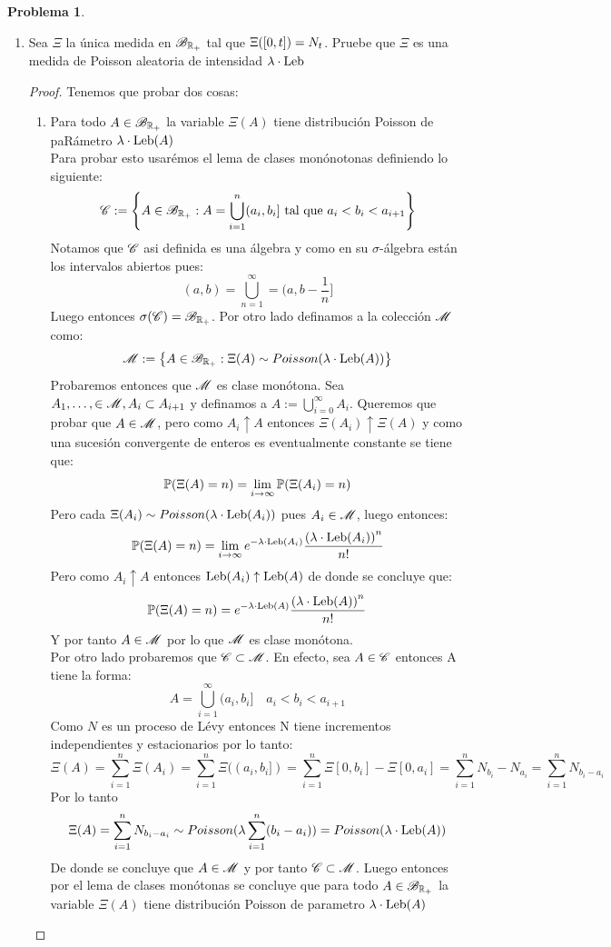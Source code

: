 \documentclass[a5paper,oneside]{amsart}
\theoremstyle{plain}
\theoremstyle{definition}
\newtheorem{problema}{Problema}
\begin{document}
\begin{problema}
\begin{enumerate}
\item Sea $\Xi$ la \'unica medida en $\mathscr{B}_{\mathbb{R}_+}$ tal que $\Xi\!\left( [0,t]\right) =N_t$. Pruebe que $\Xi$ es una medida de Poisson aleatoria de intensidad $\lambda \cdot\text{Leb}$
\begin{proof}
Tenemos que probar dos cosas:
\begin{enumerate}
\item Para todo $A\in \mathscr{B}_{\mathbb{R}_+}$ la variable $\Xi(A)$ tiene distribuci\'on  Poisson  de paR\'ametro $\lambda \cdot\text{Leb}(A)$\\
Para probar esto usar\'emos el lema de clases mon\'onotonas definiendo lo siguiente:
$$
\mathscr{C}:=\left\{ A\in \mathscr{B}_{\mathbb{R}_+} : A=\bigcup_{i=1}^{n} (a_i,b_i] \text{ tal que } a_i<b_i<a_{i+1}\right\} 
$$
Notamos que  $\mathscr{C}$ asi definida es una \'algebra  y como en su $\sigma$-\'algebra est\'an los intervalos abiertos pues:
$$
(a,b)=\bigcup_{n=1}^{\infty}=(a,b-\frac{1}{n}]
$$
Luego entonces $\sigma(\mathscr{C})=\mathscr{B}_{\mathbb{R}_+}$. Por otro lado definamos  a la colecci\'on $\mathscr{M}$ como:
$$
\mathscr{M}:=\left\{ A  \in \mathscr{B}_{\mathbb{R}_+}: \Xi(A) \sim Poisson(\lambda \cdot\text{Leb}(A))\right\} 
$$
Probaremos entonces que \ensuremath{\mc{M}} es clase mon\'otona. Sea  $A_1,\ldots, \in \mathscr{M}, A_i \subset A_{i+1}$ y definamos a $A:=\bigcup_{i=0}^{\infty}A_i$. Queremos que probar que $A \in \mathscr{M}$, pero como $A_i \uparrow A$ entonces $\Xi(A_i) \uparrow \Xi(A)$ y como una sucesi\'on convergente de enteros es eventualmente constante se tiene que:
$$
 \mathbb{P} (\Xi(A)=n)=\lim_{i\rightarrow \infty} \mathbb{P} (\Xi(A_i)=n)
$$
Pero cada $\Xi(A_i) \sim Poisson(\lambda \cdot\text{Leb}(A_i))$ pues $A_i \in \mathscr{M}$, luego entonces:
$$
 \mathbb{P} (\Xi(A)=n)=\lim_{i\rightarrow \infty}e^{-\lambda \cdot\text{Leb}(A_i)}\frac{\left( \lambda \cdot\text{Leb}(A_i)\right) ^n }{n!}
$$
Pero como $A_i \uparrow A$ entonces $ \text{Leb}(A_i) \uparrow \text{Leb}(A) $ de donde se concluye que:
$$
 \mathbb{P} (\Xi(A)=n)=e^{-\lambda \cdot\text{Leb}(A)}\frac{\left( \lambda \cdot\text{Leb}(A)\right) ^n }{n!}
$$
Y por tanto $A \in \mathscr{M}$ por lo que $\mathscr{M}$ es clase mon\'otona.\\
Por otro lado probaremos que $\mathscr{C} \subset \mathscr{M}$. En efecto, sea $A \in \mathscr{C}$ entonces A tiene la forma:
$$
A=\bigcup_{i=1}^{\infty}(a_i,b_i] \quad a_i < b_i < a_{i+1}
$$
Como $N$ es un proceso de L\'evy entonces N tiene incrementos independientes y estacionarios por lo tanto:
$$
\Xi(A)=\sum_{i=1}^{n}\Xi(A_i)=\sum_{i=1}^{n}\Xi((a_i,b_i])=\sum_{i=1}^{n}\Xi[0,b_i]-\Xi[0,a_i]=\sum_{i=1}^{n}N_{b_i}-N_{a_i}=\sum_{i=1}^{n}N_{b_i-a_i}
$$
Por lo tanto 
$$
\Xi(A)=\sum_{i=1}^{n}N_{b_i-a_i} \sim Poisson (\lambda\sum_{i=1}^{n}(b_i-a_i))=Poisson (\lambda \cdot\text{Leb}(A))
$$
De donde se concluye que $A \in \mathscr{M}$ y por tanto $\mathscr{C} \subset \mathscr{M}$. Luego entonces por el lema de clases mon\'otonas se concluye que para todo $A\in \mathscr{B}_{\mathbb{R}_+}$ la variable $\Xi(A)$ tiene distribuci\'on  Poisson  de parametro $\lambda \cdot\text{Leb}(A)$\
 

\end{enumerate}
\end{proof}
\end{enumerate}
\end{problema}
\end{document}
